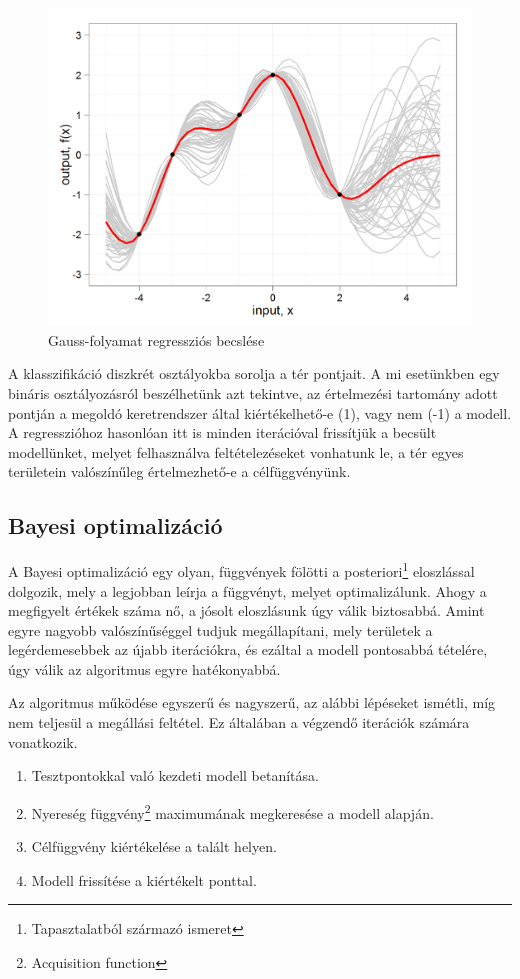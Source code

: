 \begin{figure}[!ht]
	\centering
	\includegraphics[width=140mm, keepaspectratio]{figures/gp.png}
	\caption{Gauss-folyamat regressziós becslése}
	\label{fig:gp}
\end{figure}

A klasszifikáció diszkrét osztályokba sorolja a tér pontjait. A mi esetünkben egy bináris osztályozásról beszélhetünk azt tekintve, az értelmezési tartomány adott pontján a megoldó keretrendszer által kiértékelhető-e (1), vagy nem (-1) a modell. A regresszióhoz hasonlóan itt is minden iterációval frissítjük a becsült modellünket, melyet felhasználva feltételezéseket vonhatunk le, a tér egyes területein valószínűleg értelmezhető-e a célfüggvényünk.\cite{GPKonyv}

\subsection{Bayesi optimalizáció}

\label{subsec:bayes}
A Bayesi optimalizáció egy olyan, függvények fölötti a posteriori\footnote{Tapasztalatból származó ismeret} eloszlással dolgozik, mely a legjobban leírja a függvényt, melyet optimalizálunk. Ahogy a megfigyelt értékek száma nő, a jósolt eloszlásunk úgy válik biztosabbá. Amint egyre nagyobb valószínűséggel tudjuk megállapítani, mely területek a legérdemesebbek az újabb iterációkra, és ezáltal a modell pontosabbá tételére, úgy válik az algoritmus egyre hatékonyabbá.

Az algoritmus működése egyszerű és nagyszerű, az alábbi lépéseket ismétli, míg nem teljesül a megállási feltétel. Ez általában a végzendő iterációk számára vonatkozik.
\begin{enumerate}
	\item Tesztpontokkal való kezdeti modell betanítása.
	\item Nyereség függvény\footnote{Acquisition function} maximumának megkeresése a modell alapján.
	\item Célfüggvény kiértékelése a talált helyen.
	\item Modell frissítése a kiértékelt ponttal.
\end{enumerate}

